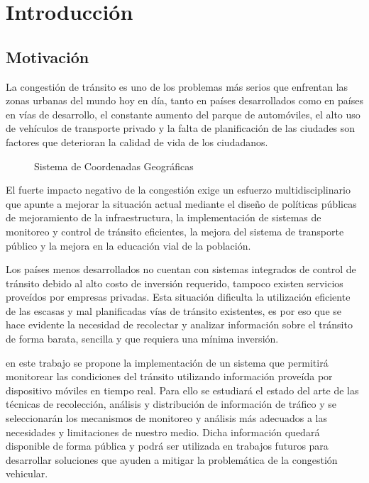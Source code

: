 \documentclass[final,fmstyle]{fpunathesis}
\begin{document}
\tableofcontents
\listoffigures

\mainmatter  %

\chapter{Introducción}

\section{Motivación}

La congestión de tránsito es uno de los problemas más serios que enfrentan las zonas urbanas del mundo hoy en día, tanto en países desarrollados como en países en vías de desarrollo, el constante aumento del parque de automóviles, el alto uso de vehículos de transporte privado y la falta de planificación de las ciudades son factores que deterioran la calidad de vida de los ciudadanos.

\begin{figure}[h]
\centering

\caption{Sistema de Coordenadas Geográficas}
\label{fig:coordenadas}
\end{figure}

El fuerte impacto negativo de la congestión exige un esfuerzo multidisciplinario que apunte a mejorar la situación actual mediante el diseño de políticas públicas de mejoramiento de la infraestructura, la implementación de sistemas de monitoreo y control de tránsito eficientes, la mejora del sistema de transporte público y la mejora en la educación vial de la población.

Los países  menos desarrollados no cuentan con sistemas integrados de control de tránsito debido al alto costo de inversión requerido, tampoco existen servicios proveídos por empresas privadas. Esta situación dificulta la utilización eficiente de las escasas y mal planificadas vías de tránsito existentes, es por eso que se hace evidente la necesidad de recolectar y analizar información sobre el tránsito de forma barata, sencilla y que requiera una mínima inversión.

 en este trabajo se propone la implementación de un sistema que permitirá monitorear las condiciones del tránsito utilizando información proveída por dispositivo móviles en tiempo real. Para ello se estudiará el estado del arte de las técnicas de recolección, análisis y distribución de información de tráfico y se seleccionarán los mecanismos de monitoreo y análisis más adecuados a las necesidades y limitaciones de nuestro medio. Dicha información quedará disponible de forma pública y podrá ser utilizada en trabajos futuros para desarrollar soluciones que ayuden a mitigar la problemática de la congestión vehicular.
\end{document}
